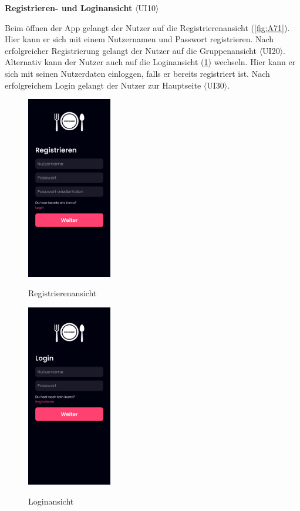 \documentclass[parskip=full]{scrartcl}
\begin{document}
\textbf{Registrieren- und Loginansicht} $\langle$UI10$\rangle$

Beim öffnen der App gelangt der Nutzer auf die Registrierenansicht (\ref{fig:A71}). Hier kann er sich mit einem Nutzernamen und Passwort registrieren. Nach erfolgreicher Registrierung gelangt der Nutzer auf die Gruppenansicht $\langle$UI20$\rangle$. Alternativ kann der Nutzer auch auf die Loginansicht (\ref{fig:A72}) wechseln. Hier kann er sich mit seinen Nutzerdaten einloggen, falls er bereits registriert ist. Nach erfolgreichem Login gelangt der Nutzer zur Hauptseite $\langle$UI30$\rangle$.

\begin{figure}[htp]
    \begin{minipage}
        [t]{0.5\textwidth}
        \centering
        \includegraphics[height=80mm]{images/section7/RegisterView.jpg}
        \label{fig:A71}
        \caption{Registrierenansicht}
    \end{minipage}
    \begin{minipage}
        [t]{0.5\textwidth}
        \centering
        \includegraphics[height=80mm]{images/section7/LoginView.jpg}
        \label{fig:A72}
        \caption{Loginansicht}
    \end{minipage}
\end{figure}
\end{document}

